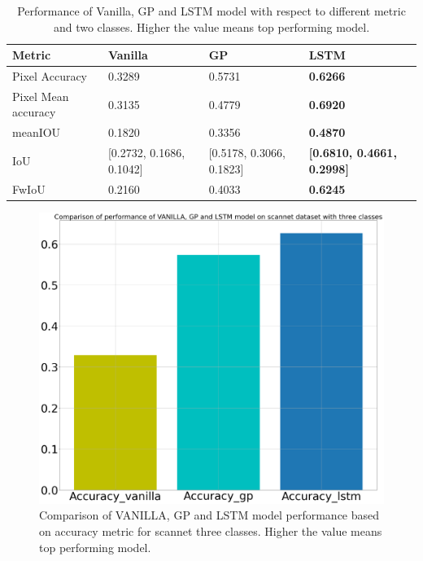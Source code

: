 	\begin{table}[h]
		\begin{center}
			\begin{tabular}{ | l | l | l | p{4cm} |}
				\hline
				
				\cellcolor{purple!30}Metric & \cellcolor{purple!30}Vanilla & \cellcolor{purple!30}GP & \cellcolor{purple!30}LSTM\\ \hline
				Pixel Accuracy & 0.3289 & 0.5731 & {\bf 0.6266} \\ \hline
				Pixel Mean accuracy & 0.3135 & 0.4779 & {\bf 0.6920} \\ \hline
				meanIOU & 0.1820 & 0.3356 & {\bf 0.4870} \\ \hline
				IoU & [0.2732, 0.1686, 0.1042] & [0.5178, 0.3066, 0.1823] & {\bf [0.6810, 0.4661, 0.2998]} \\ \hline
				FwIoU & 0.2160 & 0.4033 & {\bf 0.6245} \\ \hline
				\hline
			\end{tabular}
			\caption{Performance of Vanilla, GP and LSTM model with respect to different metric and two classes. Higher the value means top performing model.}
			\label{table:unet_scannet_three_classes}
		\end{center}
	\end{table}	
	

	\begin{figure}
		\centering
		\includegraphics[width=12cm]{images/three_classes_acc.png}
		\caption{Comparison of VANILLA, GP and LSTM model performance based on accuracy metric for scannet three classes. Higher the value means top performing model.}
		\label{fig:performance_metric_three_classes_unet}
	\end{figure}

